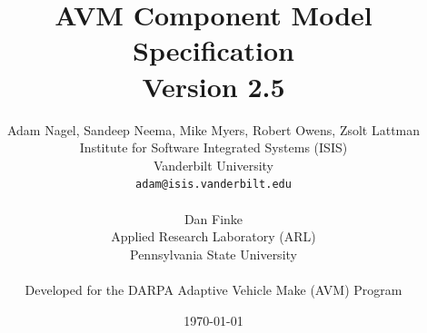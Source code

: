 \documentclass{report}
\title{AVM Component Model Specification\\Version 2.5}
\author{Adam Nagel, Sandeep Neema, Mike Myers, Robert Owens, Zsolt Lattman\\
	Institute for Software Integrated Systems (ISIS)\\
	Vanderbilt University\\
	\texttt{adam@isis.vanderbilt.edu}\\
	\\
	Dan Finke\\
	Applied Research Laboratory (ARL)\\
	Pennsylvania State University\\
	\\
	Developed for the DARPA Adaptive Vehicle Make (AVM) Program}
\date{\today}
\begin{document}
\maketitle

\def\chapterautorefname{Chapter}
\def\subsubsectionautorefname{Section}
\def\subsectionautorefname{Section}
\def\sectionautorefname{Section}

\newpage
\tableofcontents
\cleardoublepage
\listoffigures

\newpage
























\end{document}
